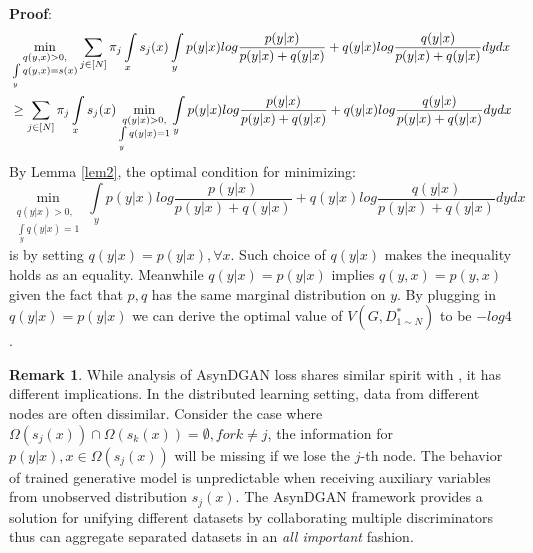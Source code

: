 \documentclass{article}
\theoremstyle{definition}
\newtheorem{remark}{Remark}
\begin{document}
	\textbf{Proof}:\\
	\begin{equation*}
	\begin{aligned}
	&\min\limits_{\substack{ q(y,x)>0,\\\int\limits_{y} q(y,x)=s(x)}}\sum\limits_{j\in[N]} \pi_j \int\limits_{x}s_j(x)\int\limits_{y} p(y|x)log\frac{p(y|x)}{p(y|x)+q(y|x)}+q(y|x)log\frac{q(y|x)}{p(y|x)+q(y|x)} dydx\\
	&\geq\sum\limits_{j\in[N]} \pi_j \int\limits_{x}s_j(x) \min\limits_{\substack{ q(y|x)>0,\\\int\limits_{y} q(y|x)=1}}\int\limits_{y} p(y|x)log\frac{p(y|x)}{p(y|x)+q(y|x)}+q(y|x)log\frac{q(y|x)}{p(y|x)+q(y|x)} dydx\\
	\end{aligned}\\
	\end{equation*}
	By Lemma \ref{lem2}, the optimal condition for minimizing:\\
	\begin{equation*}
	\min\limits_{\substack{ q(y|x)>0,\\\int\limits_{y} q(y|x)=1}}\int\limits_{y} p(y|x)log\frac{p(y|x)}{p(y|x)+q(y|x)}+q(y|x)log\frac{q(y|x)}{p(y|x)+q(y|x)} dydx
	\end{equation*}
	is by setting $q(y|x)=p(y|x), \forall x$. Such choice of $q(y|x)$ makes the inequality holds as an equality. Meanwhile $q(y|x)=p(y|x)$ implies $q(y,x)=p(y,x)$ given the fact that $p,q$ has the same marginal distribution on $y$. By plugging in $q(y|x)=p(y|x)$ we can derive the optimal value of $V(G,D^*_{1\sim N})$ to be $-log4$.
	
	\begin{remark}
		While analysis of AsynDGAN loss shares similar spirit with \cite{goodfellow2014generative}, it has different implications. In the distributed learning setting, data from different nodes are often dissimilar. Consider the case where $\Omega(s_j(x)) \cap \Omega(s_k(x)) =\emptyset, for k \neq j$, the information for $p(y|x), x\in \Omega(s_j(x))$ will be missing if we lose the $j$-th node. The behavior of trained generative model is unpredictable when receiving auxiliary variables from unobserved  distribution $s_j(x)$.
		The AsynDGAN framework provides a solution for unifying different datasets by collaborating multiple discriminators thus can aggregate separated datasets in an \emph{all important} fashion.
	\end{remark}
	

	
\end{document}
